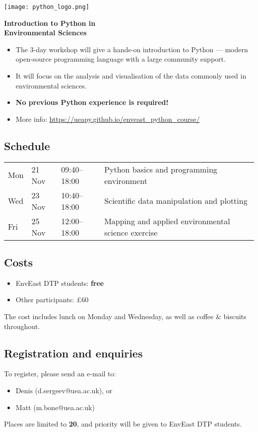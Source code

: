 \documentclass[paper=a4]{scrartcl}
\newcommand*{\pyitem}{\item [{\texttt{[image: python\_logo.png]}}]}
\begin{document}
\pagestyle{empty} %

\begin{center}
\begin{minipage}{0.2\linewidth}
    \texttt{[image: python\_logo.png]}
    \vspace{0.5cm}
\end{minipage}

\Huge \textbf{Introduction to Python in \\ Environmental Sciences}

\end{center}

\begin{itemize}
\pyitem The 3-day workshop will give a hands-on introduction to Python --- modern open-source programming language with a large community support.
\pyitem It will focus on the analysis and visualisation of the data commonly used in environmental sciences.
\pyitem \textbf{No previous Python experience is required!}
\pyitem More info: \url{https://ueapy.github.io/enveast_python_course/}
\end{itemize}


\subsection*{Schedule}
\begin{center}
\begin{tabular}{llll}
Mon & 21 Nov & 09:40--18:00 & Python basics and programming environment\\
Wed & 23 Nov & 10:40--18:00 & Scientific data manipulation and plotting \\
Fri & 25 Nov & 12:00--18:00 & Mapping and applied environmental science exercise\\
\end{tabular}
\end{center}


\subsection*{Costs}
\begin{itemize}
\pyitem EnvEast DTP students: \textbf{free}
\pyitem Other participants: \pounds 60
\end{itemize}
\vspace{-0.5cm}
\scriptsize The cost includes lunch on Monday and Wednesday, as well as coffee \& biscuits throughout. \normalsize

\subsection*{Registration and enquiries}
To register, please send an e-mail to:
\begin{itemize}
\pyitem Denis (d.sergeev@uea.ac.uk), or
\pyitem Matt (m.bone@uea.ac.uk)
\end{itemize}
Places are limited to \textbf{20}, and priority will be given to EnvEast DTP students.
\end{document}
